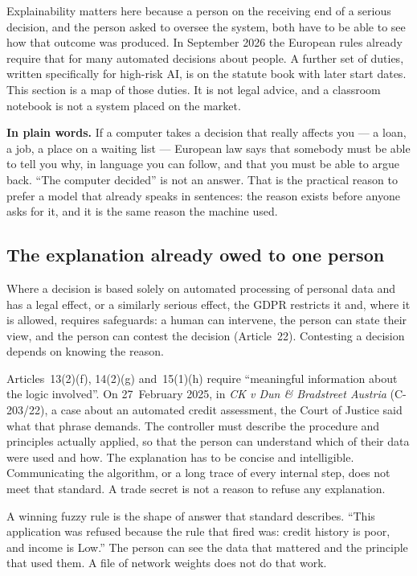 \documentclass[11pt]{article}
\begin{document}
Explainability matters here because a person on the receiving end of a serious decision, and the person asked to oversee the system, both have to be able to see how that outcome was produced. In September 2026 the European rules already require that for many automated decisions about people. A further set of duties, written specifically for high-risk AI, is on the statute book with later start dates. This section is a map of those duties. It is not legal advice, and a classroom notebook is not a system placed on the market.

\begin{plainwords}
\textbf{In plain words.} If a computer takes a decision that really affects you --- a loan, a job, a place on a waiting list --- European law says that somebody must be able to tell you why, in language you can follow, and that you must be able to argue back. ``The computer decided'' is not an answer. That is the practical reason to prefer a model that already speaks in sentences: the reason exists before anyone asks for it, and it is the same reason the machine used.
\end{plainwords}

\subsection{The explanation already owed to one person}

Where a decision is based solely on automated processing of personal data and has a legal effect, or a similarly serious effect, the GDPR restricts it and, where it is allowed, requires safeguards: a human can intervene, the person can state their view, and the person can contest the decision (Article~22). Contesting a decision depends on knowing the reason.

Articles~13(2)(f), 14(2)(g) and~15(1)(h) require ``meaningful information about the logic involved''. On 27~February 2025, in \emph{CK v Dun \& Bradstreet Austria} (C-203/22), a case about an automated credit assessment, the Court of Justice said what that phrase demands. The controller must describe the procedure and principles actually applied, so that the person can understand which of their data were used and how. The explanation has to be concise and intelligible. Communicating the algorithm, or a long trace of every internal step, does not meet that standard. A trade secret is not a reason to refuse any explanation.

A winning fuzzy rule is the shape of answer that standard describes. ``This application was refused because the rule that fired was: credit history is poor, and income is Low.'' The person can see the data that mattered and the principle that used them. A file of network weights does not do that work.
\end{document}
